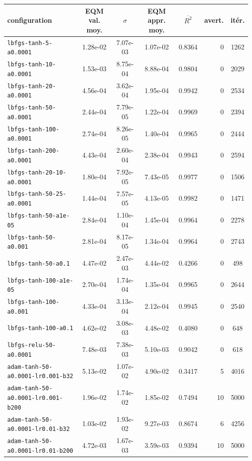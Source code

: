 \begin{tabular}{l S[table-format=1.2e-2] S[table-format=1.2e-2] S[table-format=1.2e-2] S[table-format=1.4] r S[table-format=4]}
\toprule
{configuration} & {EQM val. moy.} & {\(\sigma\)} & {EQM appr. moy.} & {\(\overline{R^2}\)} & {avert.} & {it\'er.} \\
\midrule
\texttt{lbfgs-tanh-5-a0.0001} & 1.28e-02 & 7.07e-03 & 1.07e-02 & 0.8364 & 0 & 1262 \\
\texttt{lbfgs-tanh-10-a0.0001} & 1.53e-03 & 8.75e-04 & 8.88e-04 & 0.9804 & 0 & 2029 \\
\texttt{lbfgs-tanh-20-a0.0001} & 4.56e-04 & 3.62e-04 & 1.95e-04 & 0.9942 & 0 & 2534 \\
\texttt{lbfgs-tanh-50-a0.0001} & 2.44e-04 & 7.79e-05 & 1.22e-04 & 0.9969 & 0 & 2394 \\
\texttt{lbfgs-tanh-100-a0.0001} & 2.74e-04 & 8.26e-05 & 1.40e-04 & 0.9965 & 0 & 2444 \\
\texttt{lbfgs-tanh-200-a0.0001} & 4.43e-04 & 2.60e-04 & 2.38e-04 & 0.9943 & 0 & 2594 \\
\texttt{lbfgs-tanh-20-10-a0.0001} & 1.80e-04 & 7.92e-05 & 7.43e-05 & 0.9977 & 0 & 1506 \\
\texttt{lbfgs-tanh-50-25-a0.0001} & 1.44e-04 & 7.57e-05 & 4.13e-05 & 0.9982 & 0 & 1471 \\
\texttt{lbfgs-tanh-50-a1e-05} & 2.84e-04 & 1.10e-04 & 1.45e-04 & 0.9964 & 0 & 2278 \\
\texttt{lbfgs-tanh-50-a0.001} & 2.81e-04 & 8.17e-05 & 1.34e-04 & 0.9964 & 0 & 2743 \\
\texttt{lbfgs-tanh-50-a0.1} & 4.47e-02 & 2.47e-03 & 4.44e-02 & 0.4266 & 0 & 498 \\
\texttt{lbfgs-tanh-100-a1e-05} & 2.70e-04 & 1.74e-04 & 1.35e-04 & 0.9965 & 0 & 2644 \\
\texttt{lbfgs-tanh-100-a0.001} & 4.33e-04 & 3.13e-04 & 2.12e-04 & 0.9945 & 0 & 2540 \\
\texttt{lbfgs-tanh-100-a0.1} & 4.62e-02 & 3.08e-03 & 4.48e-02 & 0.4080 & 0 & 648 \\
\texttt{lbfgs-relu-50-a0.0001} & 7.48e-03 & 7.38e-03 & 5.10e-03 & 0.9042 & 0 & 618 \\
\texttt{adam-tanh-50-a0.0001-lr0.001-b32} & 5.13e-02 & 1.07e-02 & 4.90e-02 & 0.3417 & 5 & 4016 \\
\texttt{adam-tanh-50-a0.0001-lr0.001-b200} & 1.96e-02 & 1.74e-02 & 1.85e-02 & 0.7494 & 10 & 5000 \\
\texttt{adam-tanh-50-a0.0001-lr0.01-b32} & 1.03e-02 & 1.93e-02 & 9.27e-03 & 0.8674 & 6 & 4256 \\
\texttt{adam-tanh-50-a0.0001-lr0.01-b200} & 4.72e-03 & 1.67e-03 & 3.59e-03 & 0.9394 & 10 & 5000 \\
\bottomrule
\end{tabular}
